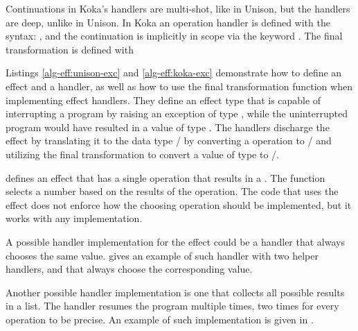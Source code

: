 

Continuations in Koka's handlers are multi-shot, like in Unison, but the handlers are deep, unlike in Unison. In Koka an operation handler is defined with the syntax: , and the continuation is implicitly in scope via the keyword . The final transformation is defined with 



Listings \ref{alg-eff:unison-exc} and \ref{alg-eff:koka-exc} demonstrate how to define an effect and a handler, as well as how to use the final transformation function when implementing effect handlers. They define an effect type  that is capable of interrupting a program by raising an exception of type , while the uninterrupted program would have resulted in a value of type . The handlers discharge the effect by translating it to the data type / by converting a  operation to / and utilizing the final transformation to convert a value of type  to /.



 defines an effect  that has a single operation  that results in a . The function  selects a number based on the results of the  operation. The code that uses the effect does not enforce how the choosing operation should be implemented, but it works with any implementation.

A possible handler implementation for the  effect could be a handler that always chooses the same  value.  gives an example of such handler with two helper handlers,  and  that always choose the corresponding value.



Another possible handler implementation is one that collects all possible results in a list.
The handler resumes the program multiple times, two times for every  operation to be precise. An example of such implementation is given in .

